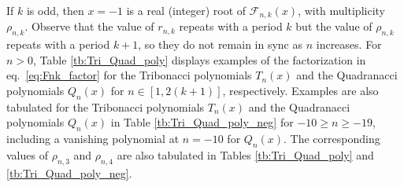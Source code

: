 \documentclass[review]{elsarticle}
\theoremstyle{plain}
\begin{document}
If $k$ is odd, then $x=-1$ is a real (integer) root of $\mathcal{F}_{n,k}(x)$, with multiplicity $\rho_{n,k}$. 
Observe that the value of $r_{n,k}$ repeats with a period $k$ but the value of $\rho_{n,k}$ repeats with a period $k+1$,
so they do not remain in sync as $n$ increases.
For $n>0$, Table \ref{tb:Tri_Quad_poly}
displays examples of the factorization in eq.~\eqref{eq:Fnk_factor}
for the Tribonacci polynomials $T_n(x)$ and the Quadranacci polynomials $Q_n(x)$
for $n\in[1,2(k+1)]$, respectively.
Examples are also tabulated for the Tribonacci polynomials $T_n(x)$ and the Quadranacci polynomials $Q_n(x)$ in Table \ref{tb:Tri_Quad_poly_neg}
for $-10 \ge n\ge -19$,
including a vanishing polynomial at $n=-10$ for $Q_n(x)$.
The corresponding values of $\rho_{n,3}$ and $\rho_{n,4}$ are also tabulated in Tables \ref{tb:Tri_Quad_poly} and \ref{tb:Tri_Quad_poly_neg}.

\setcounter{equation}{0}
\end{document}
